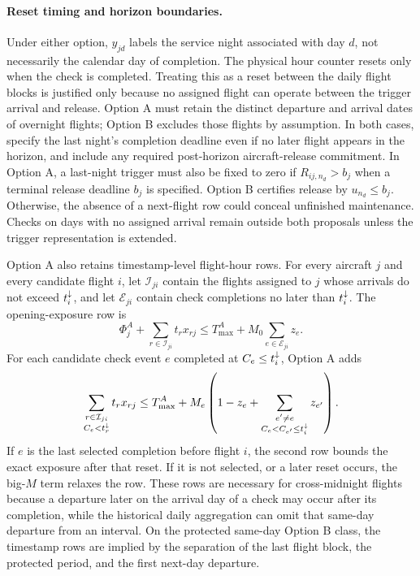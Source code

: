 \paragraph{Reset timing and horizon boundaries.}
Under either option, $y_{jd}$ labels the service night associated with day
$d$, not necessarily the calendar day of completion. The physical hour
counter resets only when the check is completed. Treating this as a reset
between the daily flight blocks is justified only because no assigned
flight can operate between the trigger arrival and release. Option A must
retain the distinct departure and arrival dates of overnight flights;
Option B excludes those flights by assumption. In both cases, specify the
last night's completion deadline even if no later flight appears in the
horizon, and include any required post-horizon aircraft-release commitment.
In Option A, a last-night trigger must also be fixed to zero if
$R_{ij,n_d}>b_j$ when a terminal release deadline $b_j$ is specified.
Option B certifies release by $u_{n_d}\le b_j$.
Otherwise, the absence of a next-flight row could conceal unfinished
maintenance. Checks on days with no assigned arrival remain outside both
proposals unless the trigger representation is extended.

Option A also retains timestamp-level flight-hour rows. For every aircraft $j$
and every candidate flight $i$, let $\mathcal{I}_{ji}$ contain the flights
assigned to $j$ whose arrivals do not exceed $t^{\downarrow}_{i}$, and let
$\mathcal{E}_{ji}$ contain check completions no later than $t^{\downarrow}_{i}$.
The opening-exposure row is
\begin{equation}
  \Phi^A_j+\sum_{r\in\mathcal{I}_{ji}}t_r x_{rj}
  \le T^A_{\max}+M_0\sum_{e\in\mathcal{E}_{ji}}z_e.
  \label{eq:option_a_opening_timestamp}
\end{equation}
For each candidate check event $e$ completed at $C_e\le t^{\downarrow}_{i}$, Option A adds
\begin{equation}
  \sum_{\substack{r\in\mathcal{I}_{ji}\\ C_e<t^{\downarrow}_{r}}} t_r x_{rj}
  \le T^A_{\max}
    +M_e\left(1-z_e+
      \sum_{\substack{e'\ne e\\ C_e<C_{e'}\le t^{\downarrow}_{i}}}z_{e'}\right).
  \label{eq:option_a_event_timestamp}
\end{equation}
If $e$ is the last selected completion before flight $i$, the second row
bounds the exact exposure after that reset. If it is not selected, or a later
reset occurs, the big-$M$ term relaxes the row. These rows are necessary for
cross-midnight flights because a departure later on the arrival day of a
check may occur after its completion, while the historical daily aggregation
can omit that same-day departure from an interval. On the protected same-day
Option B class, the timestamp rows are implied by the separation of the last
flight block, the protected period, and the first next-day departure.

